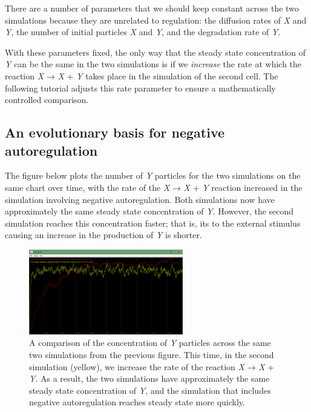 There are a number of parameters that we should keep constant across the two simulations because they are unrelated to regulation: the diffusion rates of \textit{X} and \textit{Y}, the number of initial particles \textit{X} and \textit{Y}, and the degradation rate of \textit{Y}.

With these parameters fixed, the only way that the steady state concentration of \textit{Y} can be the same in the two simulations is if we \textit{increase} the rate at which the reaction \textit{X} → \textit{X} + \textit{Y} takes place in the simulation of the second cell. The following tutorial adjusts this rate parameter to ensure a mathematically controlled comparison.


\FloatBarrier
{}
\subsection{An evolutionary basis for negative autoregulation}

The figure below plots the number of \textit{Y} particles for the two simulations on the same chart over time, with the rate of the \textit{X} → \textit{X} + \textit{Y} reaction increased in the simulation involving negative autoregulation. Both  simulations now have approximately the same steady state concentration of \textit{Y}. However, the second simulation reaches this concentration faster; that is, its  to the external stimulus causing an increase in the production of \textit{Y} is shorter.

\begin{figure}[h]
\centering
\mySfFamily
\includegraphics[width = 0.6\textwidth]{../images/nar_equal_chart.png}
\caption{A comparison of the concentration of \textit{Y} particles across the same two simulations from the previous figure. This time, in the second simulation (yellow), we increase the rate of the reaction \textit{X} → \textit{X} + \textit{Y}.  As a result, the two simulations have approximately the same steady state concentration of \textit{Y}, and the simulation that includes negative autoregulation reaches steady state more quickly.}
\label{fig:nar_equal_chart}
\end{figure}

